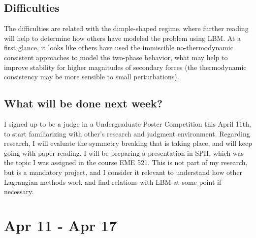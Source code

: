 \documentclass[12pt]{article}
\begin{document}
	\subsection*{Difficulties}
	The difficulties are related with the dimple-shaped regime, where further reading will help to determine how others have modeled the problem using LBM. At a first glance, it looks like others have used the immiscible no-thermodynamic consistent approaches to model the two-phase behavior, what may help to improve stability for higher magnitudes of secondary forces (the thermodynamic consistency may be more sensible to small perturbations). 
	
	
	\subsection*{What will be done next week?}
	
	I signed up to be a judge in a Undergraduate Poster Competition this April 11th, to start familiarizing with other's research and judgment environment. Regarding research, I will evaluate the symmetry breaking that is taking place, and will keep going with paper reading. I will be preparing a presentation in SPH, which was the topic I was assigned in the course EME 521. This is not part of my research, but is a mandatory project, and I consider it relevant to understand how other Lagrangian methods work and find relations with LBM at some point if necessary.
	
	
	\pagebreak
	\section*{Apr 11 - Apr 17}
\end{document}
